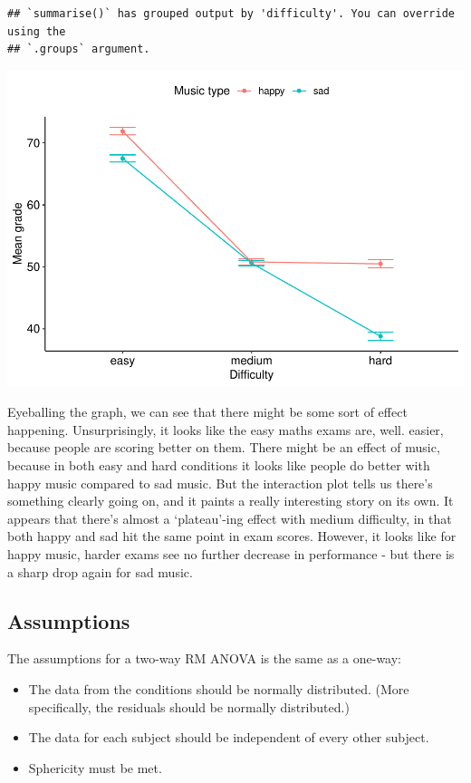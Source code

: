 \documentclass[
]{book}
\begin{document}
\begin{verbatim}
## `summarise()` has grouped output by 'difficulty'. You can override using the
## `.groups` argument.
\end{verbatim}

\includegraphics{_main_files/figure-latex/unnamed-chunk-253-1.pdf}

Eyeballing the graph, we can see that there might be some sort of effect happening. Unsurprisingly, it looks like the easy maths exams are, well. easier, because people are scoring better on them. There might be an effect of music, because in both easy and hard conditions it looks like people do better with happy music compared to sad music. But the interaction plot tells us there's something clearly going on, and it paints a really interesting story on its own. It appears that there's almost a `plateau'-ing effect with medium difficulty, in that both happy and sad hit the same point in exam scores. However, it looks like for happy music, harder exams see no further decrease in performance - but there is a sharp drop again for sad music.

\subsection{Assumptions}\label{assumptions-1}

The assumptions for a two-way RM ANOVA is the same as a one-way:

\begin{itemize}
\item
  The data from the conditions should be normally distributed. (More specifically, the residuals should be normally distributed.)
\item
  The data for each subject should be independent of every other subject.
\item
  Sphericity must be met.
\end{itemize}
\end{document}
